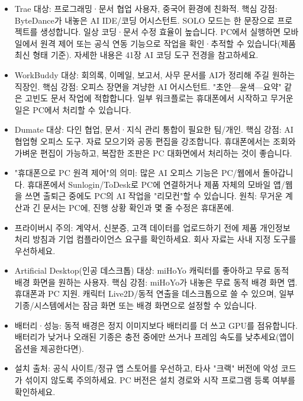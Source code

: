 
\begin{itemize}
  \item Trae 대상: 프로그래밍·문서 협업 사용자, 중국어 환경에 친화적. 핵심 강점: ByteDance가 내놓은 AI IDE/코딩 어시스턴트. SOLO 모드는 한 문장으로 프로젝트를 생성합니다. 일상 코딩·문서 수정 효율이 높습니다. PC에서 실행하면 모바일에서 원격 제어 또는 공식 연동 기능으로 작업을 확인·추적할 수 있습니다(제품 최신 형태 기준). 자세한 내용은 41장 AI 코딩 도구 전경을 참고하세요.
  \item WorkBuddy 대상: 회의록, 이메일, 보고서, 사무 문서를 AI가 정리해 주길 원하는 직장인. 핵심 강점: 오피스 장면을 겨냥한 AI 어시스턴트. "초안—윤색—요약" 같은 고빈도 문서 작업에 적합합니다. 일부 워크플로는 휴대폰에서 시작하고 무거운 일은 PC에서 처리할 수 있습니다.
  \item Dumate 대상: 다인 협업, 문서·지식 관리 통합이 필요한 팀/개인. 핵심 강점: AI 협업형 오피스 도구. 자료 모으기와 공동 편집을 강조합니다. 휴대폰에서는 조회와 가벼운 편집이 가능하고, 복잡한 조판은 PC 대화면에서 처리하는 것이 좋습니다.
  \item "휴대폰으로 PC 원격 제어"의 의미: 많은 AI 오피스 기능은 PC/웹에서 돌아갑니다. 휴대폰에서 Sunlogin/ToDesk로 PC에 연결하거나 제품 자체의 모바일 앱/웹을 쓰면 출퇴근 중에도 PC의 AI 작업을 "리모컨"할 수 있습니다. 원칙: 무거운 계산과 긴 문서는 PC에, 진행 상황 확인과 몇 줄 수정은 휴대폰에.
  \item 프라이버시 주의: 계약서, 신분증, 고객 데이터를 업로드하기 전에 제품 개인정보 처리 방침과 기업 컴플라이언스 요구를 확인하세요. 회사 자료는 사내 지정 도구를 우선하세요.
\end{itemize}


\begin{itemize}
  \item Artificial Desktop(인공 데스크톱) 대상: miHoYo 캐릭터를 좋아하고 무료 동적 배경 화면을 원하는 사용자. 핵심 강점: miHoYo가 내놓은 무료 동적 배경 화면 앱. 휴대폰과 PC 지원. 캐릭터 Live2D/동적 연출을 데스크톱으로 쓸 수 있으며, 일부 기종/시스템에서는 잠금 화면 또는 배경 화면으로 설정할 수 있습니다.
  \item 배터리·성능: 동적 배경은 정지 이미지보다 배터리를 더 쓰고 GPU를 점유합니다. 배터리가 낮거나 오래된 기종은 충전 중에만 쓰거나 프레임 속도를 낮추세요(앱이 옵션을 제공한다면).
  \item 설치 출처: 공식 사이트/정규 앱 스토어를 우선하고, 타사 "크랙" 버전에 악성 코드가 섞이지 않도록 주의하세요. PC 버전은 설치 경로와 시작 프로그램 등록 여부를 확인하세요.
\end{itemize}

